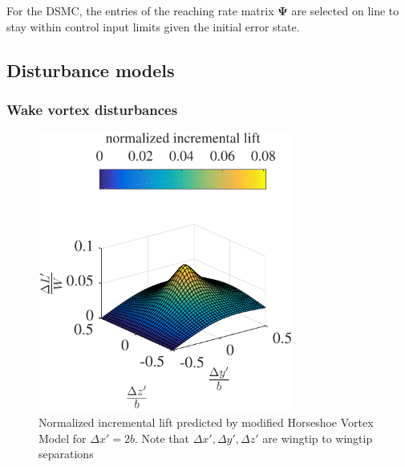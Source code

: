 \documentclass{ifacconf}
\providecommand{\mbf}[1]{\mathbf{#1}}
\begin{document}
For the DSMC, the entries of the reaching rate matrix $\mbf{\Psi}$ are selected on line to stay within control input limits given the initial error state.

\subsection{Disturbance models}

\subsubsection{Wake vortex disturbances}

\begin{figure}
\begin{center}
\includegraphics[width=8.4cm]{incrementallift}    %
\caption{Normalized incremental lift predicted by modified Horseshoe Vortex Model for $\Delta x' = 2b$. Note that $\Delta x', \Delta y', \Delta z'$ are wingtip to wingtip separations}
\label{fig:HSVMincrementalift}
\end{center}
\end{figure}
\end{document}
